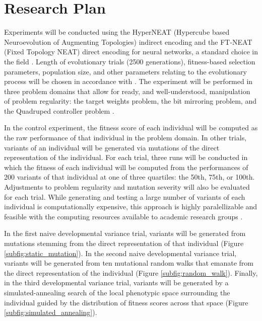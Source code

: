 \section{Research Plan}

Experiments will be conducted using the HyperNEAT (Hypercube based Neuroevolution of Augmenting Topologies) indirect encoding and the FT-NEAT (Fixed Topology NEAT) direct encoding for neural networks, a standard choice in the field \cite{Stanley2009ANetworks,Clune2011OnRegularity}. Length of evolutionary trials (2500 generations), fitness-based selection parameters, population size, and other parameters relating to the evolutionary process will be chosen in accordance with \cite{Clune2011OnRegularity}. The experiment will be performed in three problem domains that allow for ready, and well-understood, manipulation of problem regularity: the target weights problem, the bit mirroring problem, and the Quadruped controller problem \cite{Clune2011OnRegularity}. 

In the control experiment, the fitness score of each individual will be computed as the raw performance of that individual in the problem domain. In other trials, variants of an individual will be generated via mutations of the direct representation of the individual. For each trial, three runs will be conducted in which the fitness of each individual will be computed from the performances of 200 variants of that individual at one of three quartiles: the 50th, 75th, or 100th. Adjustments to problem regularity and mutation severity will also be evaluated for each trial. While generating and testing a large number of variants of each individual is computationally expensive, this approach is highly paralellizable and feasible with the computing resources available to academic research groups \cite{Mengistu2016EvolvabilityIt}.

In the first naive developmental variance trial, variants will be generated from mutations stemming from the direct representation of that individual (Figure \ref{subfig:static_mutation}). In the second naive developmental variance trial, variants will be generated from ten mutational random walks that emanate from the direct representation of the individual (Figure \ref{subfig:random_walk}). Finally, in the third developmental variance trial, variants will be generated by a simulated-annealing search of the local phenotypic space surrounding the individual guided by the distribution of fitness scores across that space (Figure \ref{subfig:simulated_annealing}). 

